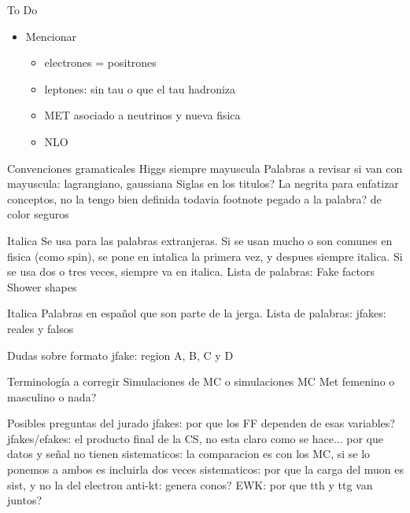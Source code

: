 
{\LARGE To Do}

\begin{itemize}
	\item Mencionar
	\begin{itemize}
		\item electrones = positrones %
		\item leptones: sin tau o que el tau hadroniza
		\item MET asociado a neutrinos y nueva fisica
		\item NLO
	\end{itemize}
\end{itemize}


{Convenciones gramaticales}
Higgs siempre mayuscula
Palabras a revisar si van con mayuscula: lagrangiano, gaussiana
Siglas en los titulos?
La negrita para enfatizar conceptos, no la tengo bien definida todavia
footnote pegado a la palabra? de color seguros

{Italica}
Se usa para las palabras extranjeras. Si se usan mucho o son comunes en fisica (como spin), se pone en intalica la primera vez, y despues siempre italica. Si se usa dos o tres veces, siempre va en italica.
Lista de palabras:
Fake factors
Shower shapes

{Italica}
Palabras en español que son parte de la jerga.
Lista de palabras:
jfakes: reales y falsos

{Dudas sobre formato}
jfake: region A, B, C y D


{Terminología a corregir}
Simulaciones de MC o simulaciones MC
Met femenino o masculino o nada?

{Posibles preguntas del jurado}
jfakes: por que los FF dependen de esas variables?
jfakes/efakes: el producto final de la CS, no esta claro como se hace...
por que datos y señal no tienen sistematicos: la comparacion es con los MC, si se lo ponemos a ambos es incluirla dos veces
sistematicos: por que la carga del muon es sist, y no la del electron
anti-kt: genera conos?
EWK: por que tth y ttg van juntos?







